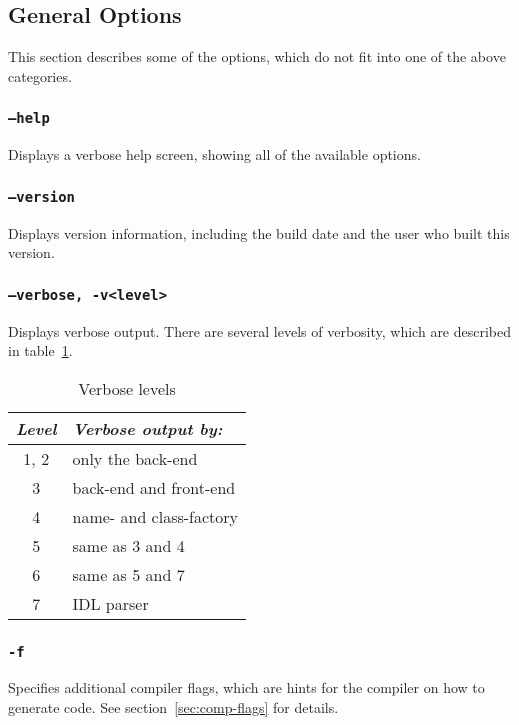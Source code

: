 \subsection{General Options}
This section describes some of the options, which do not fit into one 
of the above categories.

\subsubsection{{\tt --help}}
Displays a verbose help screen, showing all of the available
options.

\subsubsection{{\tt --version}}
Displays version information, including the build date and the
user who built this version.

\subsubsection{{\tt --verbose, -v<level>}}
Displays verbose output. There are several levels of verbosity,
which are described in table~\ref{tab:verbose}.

\begin{table}[htb]
\begin{center}
\begin{tabular}{|c|l|} \hline
\it Level & \it Verbose output by: \\ \hline \hline
1, 2 & only the back-end \\ \hline
3 & back-end and front-end \\ \hline
4 & name- and class-factory \\ \hline
5 & same as 3 and 4 \\ \hline
6 & same as 5 and 7 \\ \hline
7 & IDL parser \\ \hline
\end{tabular}
\caption{\label{tab:verbose} Verbose levels}
\end{center}
\end{table}

\subsubsection{{\tt -f}}
Specifies additional compiler flags, which are hints for the compiler
on how to generate code. See section~\ref{sec:comp-flags} for details.

